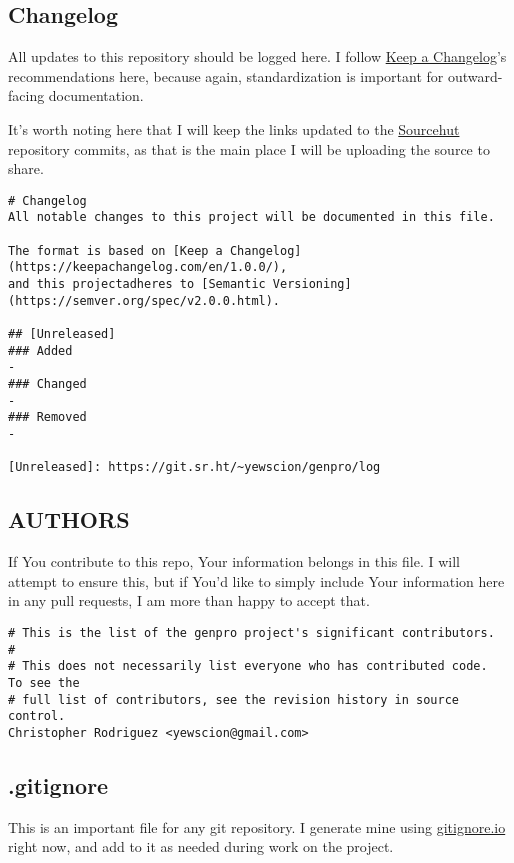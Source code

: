 \documentclass[11pt]{article}
\begin{document}
\subsection{Changelog}
\label{sec:org7d2de93}
All updates to this repository should be logged here. I follow \href{https://keepachangelog.com/}{Keep a
Changelog}'s recommendations here, because again, standardization is important
for outward-facing documentation.

It's worth noting here that I will keep the links updated to the \href{https://sr.ht/}{Sourcehut}
repository commits, as that is the main place I will be uploading the source to
share.

\begin{verbatim}
# Changelog
All notable changes to this project will be documented in this file.

The format is based on [Keep a Changelog](https://keepachangelog.com/en/1.0.0/),
and this projectadheres to [Semantic Versioning](https://semver.org/spec/v2.0.0.html).

## [Unreleased]
### Added
-
### Changed
-
### Removed
-

[Unreleased]: https://git.sr.ht/~yewscion/genpro/log
\end{verbatim}

\subsection{AUTHORS}
\label{sec:org0276893}
If You contribute to this repo, Your information belongs in this file. I will
attempt to ensure this, but if You'd like to simply include Your information
here in any pull requests, I am more than happy to accept that.

\begin{verbatim}
# This is the list of the genpro project's significant contributors.
#
# This does not necessarily list everyone who has contributed code.  To see the
# full list of contributors, see the revision history in source control.
Christopher Rodriguez <yewscion@gmail.com>
\end{verbatim}

\subsection{.gitignore}
\label{sec:org7255777}
This is an important file for any git repository. I generate mine using
\href{https://www.toptal.com/developers/gitignore}{gitignore.io} right now, and add to it as needed during work on the project.
\end{document}
